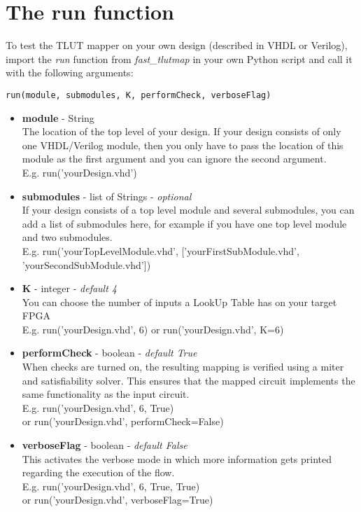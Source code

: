 \documentclass[a4paper,oneside]{memoir}
\begin{document}
\section{The run function}\label{sec:run_function}
To test the TLUT mapper on your own design (described in VHDL or Verilog), import the \emph{run} function from \emph{fast\_tlutmap} in your own Python script and call it with the following arguments:
\begin{lstlisting}
run(module, submodules, K, performCheck, verboseFlag)
\end{lstlisting}
\begin{itemize}
\item \textbf{module} - String\\
The location of the top level of your design. If your design consists of only one VHDL/Verilog module, then you only have to pass the location of this module as the first argument and you can ignore the second argument.\\

E.g. run('yourDesign.vhd')

\item \textbf{submodules} - list of Strings - \textit{optional}\\
If your design consists of a top level module and several submodules, you can add a list of submodules here, for example if you have one top level module and two submodules.\\

E.g. run('yourTopLevelModule.vhd', ['yourFirstSubModule.vhd', 'yourSecondSubModule.vhd'])

\item \textbf{K} - integer - \textit{default 4}\\
You can choose the number of inputs a LookUp Table has on your target FPGA\\

E.g. run('yourDesign.vhd', 6)
or run('yourDesign.vhd', K=6)

\item \textbf{performCheck} - boolean - \textit{default True}\\
When checks are turned on, the resulting mapping is verified using a miter and satisfiability solver. This ensures that the mapped circuit implements the same functionality as the input circuit.\\

E.g. run('yourDesign.vhd', 6, True)\\
or run('yourDesign.vhd', performCheck=False)

\item \textbf{verboseFlag} - boolean - \textit{default False}\\
This activates the verbose mode in which more information gets printed regarding the execution of the flow.\\
E.g. run('yourDesign.vhd', 6, True, True)\\ or run('yourDesign.vhd', verboseFlag=True)
\end{itemize}
\end{document}
